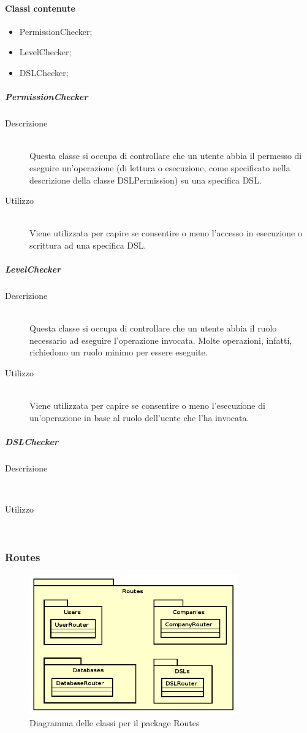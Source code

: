 \paragraph{Classi contenute}
\begin{itemize}
\item PermissionChecker;
\item LevelChecker;
\item DSLChecker;
\end{itemize}
\subparagraph{PermissionChecker}
\begin{description}
\item[Descrizione] \hfill \\
Questa classe si occupa di controllare che un utente abbia il permesso di eseguire un'operazione (di lettura o esecuzione, come specificato nella descrizione della classe DSLPermission) su una specifica DSL.
\item[Utilizzo] \hfill \\
Viene utilizzata per capire se consentire o meno l'accesso in esecuzione o scrittura ad una specifica DSL.
\end{description}
\subparagraph{LevelChecker}
\begin{description}
\item[Descrizione] \hfill \\
Questa classe si occupa di controllare che un utente abbia il ruolo necessario ad eseguire l'operazione invocata. Molte operazioni, infatti, richiedono un ruolo minimo per essere eseguite.
\item[Utilizzo] \hfill \\
Viene utilizzata per capire se consentire o meno l'esecuzione di un'operazione in base al ruolo dell'uente che l'ha invocata.
\end{description}
\subparagraph{DSLChecker}
\begin{description}
\item[Descrizione] \hfill \\
\item[Utilizzo] \hfill \\
\end{description}

\subsubsection{Routes}
\begin{figure}[h]
\centering
\includegraphics[width=0.8\textwidth]{res/sections/backend/Routes.png}
\caption{Diagramma delle classi per il package Routes}
\end{figure}

